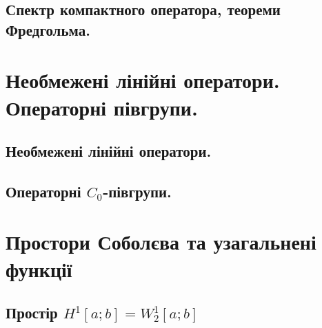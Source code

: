 \documentclass{extreport}
\begin{document}
        \section{Спектр компактного оператора, теореми Фредгольма.}
            
            
            

    \chapter{Необмежені лінійні оператори. Операторні півгрупи.}
        \section{Необмежені лінійні оператори.}
            
            
            
        \section{Операторні \texorpdfstring{$C_0$}{C0}-півгрупи.}
            
            
            
            

    \chapter{Простори Соболєва та узагальнені функції}
        \section{Простір \texorpdfstring{$H^1[a;b] = W_2^1[a;b]$}{H1[a;b] = W21[a;b]}}
            
        \newpage
\end{document}
